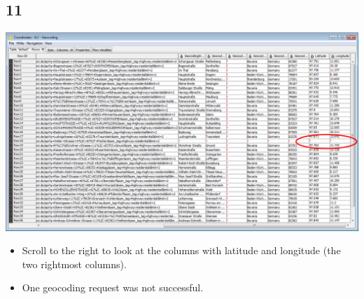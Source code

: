 \documentclass{beamer}
\begin{document}
\subsection{11}
\begin{frame}
	\begin{center}
  		\includegraphics[height=0.6\textheight]{11.png}
	\end{center}
	\begin{itemize}
		\item Scroll to the right to look at the columns with latitude and longitude (the two rightmost columns).
		\item One geocoding request was not successful. 
	\end{itemize}
\end{frame}
\end{document}
